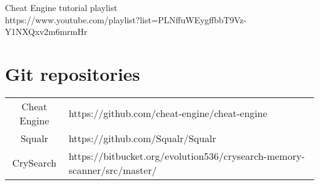 \documentclass[11pt, a4paper, draft]{article}
\begin{document}
	
	Cheat Engine tutorial playlist\\
	https://www.youtube.com/playlist?list=PLNffuWEygffbbT9Vz-Y1NXQxv2m6mrmHr
	
	\section*{Git repositories}
	\begin{center}
		\begin{tabular}{ |c|l| } 
			\hline
			Cheat Engine & https://github.com/cheat-engine/cheat-engine \\
			Squalr & https://github.com/Squalr/Squalr \\
			CrySearch & https://bitbucket.org/evolution536/crysearch-memory-scanner/src/master/ \\
			\hline
		\end{tabular}
	\end{center}
\end{document}
